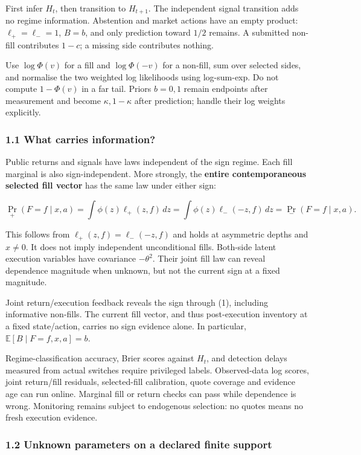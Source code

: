 \documentclass[
  10pt,
  a4paper,
]{article}
\begin{document}
First infer \(H_t\), then transition to \(H_{t+1}\). The independent
signal transition adds no regime information. Abstention and market
actions have an empty product: \(\ell_+=\ell_-=1\), \(B=b\), and only
prediction toward \(1/2\) remains. A submitted non-fill contributes
\(1-c\); a missing side contributes nothing.

Use \(\log\Phi(v)\) for a fill and \(\log\Phi(-v)\) for a non-fill, sum
over selected sides, and normalise the two weighted log likelihoods
using log-sum-exp. Do not compute \(1-\Phi(v)\) in a far tail. Priors
\(b=0,1\) remain endpoints after measurement and become
\(\kappa,1-\kappa\) after prediction; handle their log weights
explicitly.

\subsubsection{1.1 What carries
information?}\label{what-carries-information}

Public returns and signals have laws independent of the sign regime.
Each fill marginal is also sign-independent. More strongly, the
\textbf{entire contemporaneous selected fill vector} has the same law
under either sign:

\[
\Pr_+(F=f\mid x,a)
=\int\phi(z)\ell_+(z,f)\,dz
=\int\phi(z)\ell_-(-z,f)\,dz
=\Pr_-(F=f\mid x,a).
\tag{4}
\]

This follows from \(\ell_+(z,f)=\ell_-(-z,f)\) and holds at asymmetric
depths and \(x\ne0\). It does not imply independent unconditional fills.
Both-side latent execution variables have covariance \(-\theta^2\).
Their joint fill law can reveal dependence magnitude when unknown, but
not the current sign at a fixed magnitude.

Joint return/execution feedback reveals the sign through (1), including
informative non-fills. The current fill vector, and thus post-execution
inventory at a fixed state/action, carries no sign evidence alone. In
particular, \(\mathbb E[B\mid F=f,x,a]=b\).

Regime-classification accuracy, Brier scores against \(H_t\), and
detection delays measured from actual switches require privileged
labels. Observed-data log scores, joint return/fill residuals,
selected-fill calibration, quote coverage and evidence age can run
online. Marginal fill or return checks can pass while dependence is
wrong. Monitoring remains subject to endogenous selection: no quotes
means no fresh execution evidence.

\subsubsection{1.2 Unknown parameters on a declared finite
support}\label{unknown-parameters-on-a-declared-finite-support}
\end{document}
